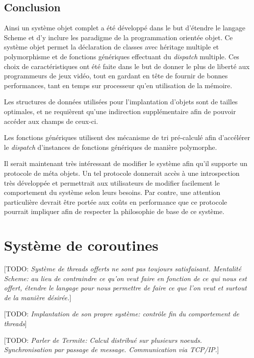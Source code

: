 \documentclass[12pt,oneside,letterpaper,francais]{book}
\newcommand{\todo}[1]{[TODO: {\it #1}]}
\begin{document}
\section{Conclusion}
Ainsi un système objet complet a été développé dans le but d'étendre
le langage Scheme et d'y inclure les paradigme de la programmation
orientée objet. Ce système objet permet la déclaration de classes avec
héritage multiple et polymorphisme et de fonctions génériques
effectuant du \textit{dispatch} multiple. Ces choix de
caractéristiques ont été faite dans le but de donner le plus de
liberté aux programmeurs de jeux vidéo, tout en gardant en tête de
fournir de bonnes performances, tant en temps sur processeur qu'en
utilisation de la mémoire.

Les structures de données utilisées pour l'implantation d'objets sont
de tailles optimales, et ne requièrent qu'une indirection
supplémentaire afin de pouvoir accéder aux champs de ceux-ci. 

Les fonctions génériques utilisent des mécanisme de tri pré-calculé
afin d'accélérer le \textit{dispatch} d'instances de fonctions
génériques de manière polymorphe. 

Il serait maintenant très intéressant de modifier le système afin
qu'il supporte un protocole de méta objets. Un tel protocole donnerait
accès à une introspection très développée et permettrait aux
utilisateurs de modifier facilement le comportement du système selon
leurs besoins. Par contre, une attention particulière devrait être
portée aux coûts en performance que ce protocole pourrait impliquer
afin de respecter la philosophie de base de ce système.



\chapter{Système de coroutines}
\todo{Système de threads offerts ne sont pas toujours
  satisfaisant. Mentalité Scheme: au lieu de contraindre ce qu'on veut
  faire en fonction de ce qui nous est offert, étendre le langage pour
  nous permettre de faire ce que l'on veut et surtout de la manière
  désirée.}

\todo{Implantation de son propre système: contrôle fin du comportement
  de threads}

\todo{Parler de Termite: Calcul distribué sur plusieurs
  noeuds. Synchronisation par passage de message. Communication via
  TCP/IP.}
\end{document}
